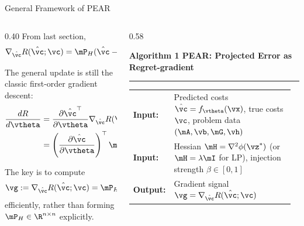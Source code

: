 \documentclass[10pt,aspectratio=169,xcolor=dvipsnames]{beamer}
\begin{document}
\begin{frame}{General Framework of PEAR}
    \begin{columns}[T,onlytextwidth]
        \begin{column}{0.40\textwidth}
            \small
            From last section,
            \[
                \nabla_{\hat{\vc}}R(\hat{\vc};\vc)
                =\mP_H(\hat{\vc}-\vc).
            \]

            The general update is still the classic first-order gradient descent:
            {\footnotesize
            \begin{equation}
                \begin{aligned}
                    \frac{dR}{d\vtheta}
                    &=\frac{\partial\hat{\vc}^{\top}}{\partial\vtheta}
                      \nabla_{\hat{\vc}}R(\hat{\vc};\vc)\\
                    &=\left(\frac{\partial\hat{\vc}}{\partial\vtheta}\right)^{\top}
                      \mP_H(\hat{\vc}-\vc).
                \end{aligned}
            \end{equation}}

            The key is to compute
            \[
                \vg:=\nabla_{\hat{\vc}}R(\hat{\vc};\vc)
                =\mP_H(\hat{\vc}-\vc)
            \]
            efficiently, rather than forming
            $\mP_H\in\R^{n\times n}$ explicitly.
        \end{column}

        \begin{column}{0.58\textwidth}
            {\fontsize{7.2}{8.3}\selectfont
            \textbf{Algorithm 1 PEAR: Projected Error as Regret-gradient}\par
            \vspace{0.1em}
            \hrule
            \vspace{0.25em}

            {\fontsize{5.9}{7}\selectfont
            \begin{tabular}{@{}p{0.12\linewidth}p{0.83\linewidth}@{}}
                \textbf{Input:} & Predicted costs $\hat{\vc}=f_{\vtheta}(\vx)$,
                true costs $\vc$, problem data $(\mA,\vb,\mG,\vh)$\\
                \textbf{Input:} & Hessian $\mH=\nabla^2\phi(\vz^*)$
                (or $\mH=\lambda\mI$ for LP), injection strength $\beta\in[0,1]$\\
                \textbf{Output:} & Gradient signal
                $\vg=\nabla_{\hat{\vc}}R(\hat{\vc};\vc)$
            \end{tabular}}

}
\end{column}
\end{columns}
\end{frame}
\end{document}
